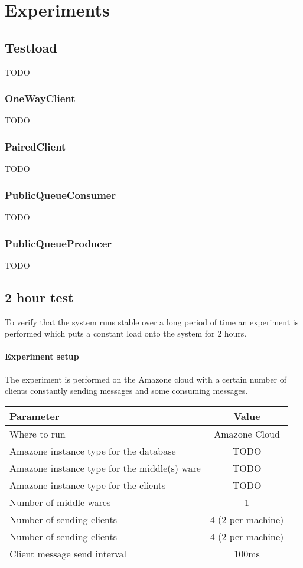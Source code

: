 \documentclass[milestone1.tex]{subfiles}
\begin{document}
\section{Experiments}

\subsection{Testload}
TODO
\subsubsection{OneWayClient}
TODO
\subsubsection{PairedClient}
TODO
\subsubsection{PublicQueueConsumer}
TODO
\subsubsection{PublicQueueProducer}
TODO
\subsection{2 hour test}



To verify that the system runs stable over a long period of time an experiment is performed which puts a constant load onto the system for 2 hours.

\paragraph{Experiment setup}
The experiment is performed on the Amazone cloud with a certain number of clients constantly sending messages and some consuming messages. 

\begin{tabular}{|l|c|}
\hline 
Parameter & Value \\
\hline 
Where to run & Amazone Cloud \\ 
Amazone instance type for the database & TODO \\ 
Amazone instance type for the middle(s) ware& TODO \\ 
Amazone instance type for the clients & TODO \\ 
Number of middle wares & 1 \\ 
Number of sending clients & 4 (2 per machine) \\ 
Number of sending clients & 4 (2 per machine) \\ 
Client message send interval & 100ms \\
\hline 
\end{tabular}
\end{document}
